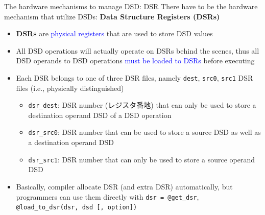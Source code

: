 \documentclass[dvipdfmx, 11pt, aspectratio=169]{beamer}   %
\begin{document}
\begin{frame}{The hardware mechanisms to manage DSD: DSR}
There have to be the hardware mechanism that utilize DSDs: \textbf{Data Structure Registers (DSRs)}
\begin{itemize}
    \item \textbf{DSRs} are \textcolor{blue}{physical registers} that are used to store DSD values
    \item All DSD operations will actually operate on DSRs behind the scenes, thus all DSD operands to DSD operations \textcolor{blue}{must be loaded to DSRs} before executing
    \item Each DSR belongs to one of three DSR files, namely \lstinline|dest|, \lstinline|src0|, \lstinline|src1| DSR files (i.e., physically distinguished)
    \begin{itemize}
        \item \lstinline|dsr_dest|: DSR number (レジスタ番地) that can only be used to store a destination operand DSD of a DSD operation
        \item \lstinline|dsr_src0|: DSR number that can be used to store a source DSD as well as a destination operand DSD
        \item \lstinline|dsr_src1|: DSR number that can only be used to store a source operand DSD
    \end{itemize}
    \item Basically, compiler allocate DSR (and extra DSR) automatically, but programmers can use them directly with \lstinline|dsr = @get_dsr|, \lstinline|@load_to_dsr(dsr, dsd [, option])|
\end{itemize}
\end{frame}
\end{document}
